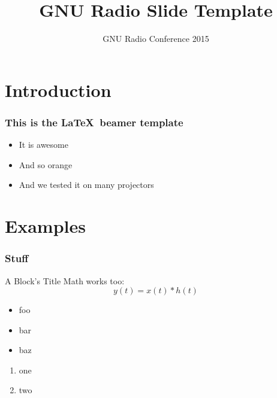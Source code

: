 \documentclass{beamer}
\title{GNU Radio Slide Template}
\institute{Author, Affiliation}
\date{GNU Radio Conference 2015}
\begin{document}
\frame{\titlepage}

\section{Introduction}
\begin{frame}
  \frametitle{This is the \LaTeX\ beamer template}
  \begin{itemize}
    \item It is awesome
    \item<2-> And so orange
    \item<3-> And we tested it on many projectors
  \end{itemize}
\end{frame}

\section{Examples}
\begin{frame}
  \frametitle{Stuff}
  \begin{block}{A Block's Title}
    Math works too:
    \begin{equation}
      y(t) = x(t) * h(t)
    \end{equation}
  \end{block}
  \begin{itemize}
    \item foo
    \item bar
    \item baz
  \end{itemize}
  \begin{enumerate}
    \item one
    \item two
  \end{enumerate}
\end{frame}
\end{document}
